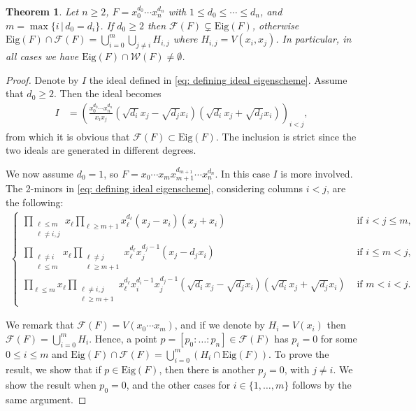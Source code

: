 \documentclass{amsart}
\newtheorem{theorem}{Theorem}
\numberwithin{theorem}{section}
\theoremstyle{definition}
\newcommand{\Eig}{\mathrm{Eig}}
\newcommand{\W}{\mathcal{W}}
\begin{document}
\begin{theorem}\label{prop: monomial case}
 Let $n\geq 2$, $F=x_0^{d_0}\cdots x_n^{d_n}$ with $1\leq d_0\leq \cdots \leq d_n$, and $m=\max \{ i \, \vert \, d_0=d_i \}$. If $d_0\geq 2$ then $\mathcal{F}(F)\subsetneq  \mathrm{Eig}(F)$, otherwise  $\Eig(F)\cap\mathcal F(F)=\bigcup_{i=0}^{m} \bigcup_{j\neq i} H_{i,j}$ where $H_{i,j}=V(x_i,x_j)$. In particular, in all cases we have $\Eig(F)\cap \W(F)\neq \emptyset$.

\end{theorem}
\begin{proof}
Denote by $I$ the ideal defined in \cref{eq: defining ideal eigenscheme}. Assume that $d_0\geq 2$. Then the ideal becomes
\begin{align*}
I&=\left(\frac{x_0^{d_0}\cdots x_n^{d_n}}{x_ix_j}(\sqrt{d_i}x_j-\sqrt{d_j}x_i)(\sqrt{d_i}x_j+\sqrt{d_j}x_i) \right)_{i<j}, 
\end{align*}
from which it is obvious that $\mathcal{F}(F)\subset \Eig(F)$. The inclusion is strict since the two ideals are generated in different degrees. 


We now assume $d_0=1$, so $F=x_0\cdots x_m x_{m+1}^{d_{m+1}}\cdots x_n^{d_n}$. In this case $I$ is more involved. The 2-minors in \cref{eq: defining ideal eigenscheme}, considering columns $i<j$, are the following:
\begin{align}\label{eq: ideali 2-minori}
\begin{cases}
    \prod\limits_{\substack{\ell \leq m\\ \ell\neq i,j}}x_\ell \prod\limits_{\ell \geq m+1} x_\ell^{d_\ell}(x_j-x_i)(x_j+x_i) & \text{ if } i<j\leq m,\\
    \prod\limits_{\substack{\ell \neq i\\ \ell \leq m}} x_\ell \prod\limits_{\substack{\ell \neq j\\ \ell \geq m+1}}x_\ell^{d_\ell} x_j^{d_j-1}(x_j-d_jx_i) & \text{ if } i\leq m< j, \\
  \prod\limits_{ \ell \leq m} x_\ell \prod\limits_{\substack{\ell \neq i,j\\ \ell \geq m+1}}x_\ell^{d_\ell}  x_i^{d_i-1}x_j^{d_j-1}(\sqrt{d_i}x_j-\sqrt{d_j}x_i) (\sqrt{d_i}x_j+\sqrt{d_j}x_i) & \text{ if }m<i<j.
\end{cases}
\end{align}



\bigskip



{We remark that $ \mathcal F(F)=V(x_0\cdots x_m)$, and if we denote by $H_i=V(x_i)$ then $\mathcal F(F)=\bigcup_{i=0}^mH_i $. Hence, a point $p=[p_0:\dots:p_n]\in \mathcal F(F)$ has $p_i=0$ for some $ 0\leq i\leq m$ and $\Eig(F)\cap \mathcal F(F)=\bigcup_{i=0}^m (H_i\cap \Eig(F))$. To prove the result, we show that if $p\in \Eig(F)$, then there is another $p_j=0$, with $j\neq i$. We show the result when $p_0=0$, and the other cases for $i\in\{1,\dots,m\}$ follows by the same argument.

}
\end{proof}
\end{document}
